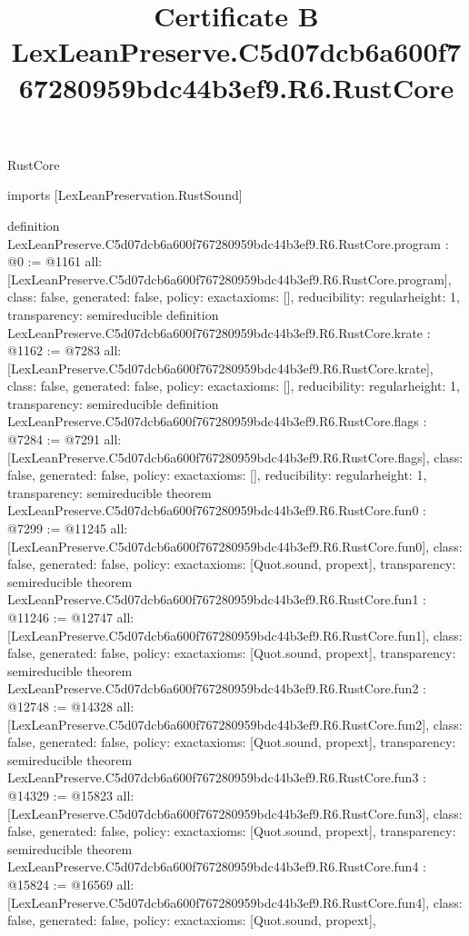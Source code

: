 \begin{lexlean}{RustCore}
\title{Certificate B LexLeanPreserve.C5d07dcb6a600f767280959bdc44b3ef9.R6.RustCore}
\begin{coremodule}
imports [LexLeanPreservation.RustSound]

definition LexLeanPreserve.C5d07dcb6a600f767280959bdc44b3ef9.R6.RustCore.program : @0 := @1161 {
  all: [LexLeanPreserve.C5d07dcb6a600f767280959bdc44b3ef9.R6.RustCore.program],
  class: false,
  generated: false,
  policy: exact{axioms: []},
  reducibility: regular{height: 1},
  transparency: semireducible
}
definition LexLeanPreserve.C5d07dcb6a600f767280959bdc44b3ef9.R6.RustCore.krate : @1162 := @7283 {
  all: [LexLeanPreserve.C5d07dcb6a600f767280959bdc44b3ef9.R6.RustCore.krate],
  class: false,
  generated: false,
  policy: exact{axioms: []},
  reducibility: regular{height: 1},
  transparency: semireducible
}
definition LexLeanPreserve.C5d07dcb6a600f767280959bdc44b3ef9.R6.RustCore.flags : @7284 := @7291 {
  all: [LexLeanPreserve.C5d07dcb6a600f767280959bdc44b3ef9.R6.RustCore.flags],
  class: false,
  generated: false,
  policy: exact{axioms: []},
  reducibility: regular{height: 1},
  transparency: semireducible
}
theorem LexLeanPreserve.C5d07dcb6a600f767280959bdc44b3ef9.R6.RustCore.fun0 : @7299 := @11245 {
  all: [LexLeanPreserve.C5d07dcb6a600f767280959bdc44b3ef9.R6.RustCore.fun0],
  class: false,
  generated: false,
  policy: exact{axioms: [Quot.sound, propext]},
  transparency: semireducible
}
theorem LexLeanPreserve.C5d07dcb6a600f767280959bdc44b3ef9.R6.RustCore.fun1 : @11246 := @12747 {
  all: [LexLeanPreserve.C5d07dcb6a600f767280959bdc44b3ef9.R6.RustCore.fun1],
  class: false,
  generated: false,
  policy: exact{axioms: [Quot.sound, propext]},
  transparency: semireducible
}
theorem LexLeanPreserve.C5d07dcb6a600f767280959bdc44b3ef9.R6.RustCore.fun2 : @12748 := @14328 {
  all: [LexLeanPreserve.C5d07dcb6a600f767280959bdc44b3ef9.R6.RustCore.fun2],
  class: false,
  generated: false,
  policy: exact{axioms: [Quot.sound, propext]},
  transparency: semireducible
}
theorem LexLeanPreserve.C5d07dcb6a600f767280959bdc44b3ef9.R6.RustCore.fun3 : @14329 := @15823 {
  all: [LexLeanPreserve.C5d07dcb6a600f767280959bdc44b3ef9.R6.RustCore.fun3],
  class: false,
  generated: false,
  policy: exact{axioms: [Quot.sound, propext]},
  transparency: semireducible
}
theorem LexLeanPreserve.C5d07dcb6a600f767280959bdc44b3ef9.R6.RustCore.fun4 : @15824 := @16569 {
  all: [LexLeanPreserve.C5d07dcb6a600f767280959bdc44b3ef9.R6.RustCore.fun4],
  class: false,
  generated: false,
  policy: exact{axioms: [Quot.sound, propext]},
}
\end{coremodule}
\end{lexlean}
